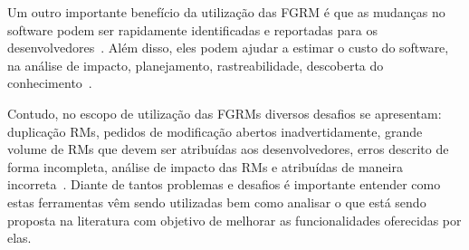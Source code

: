 Um outro importante benefício da utilização das FGRM é que as mudanças no
software podem ser rapidamente identificadas e reportadas para os
desenvolvedores~\cite{anvik2005coping}. Além disso, eles podem ajudar a estimar
o custo do software, na análise de impacto, planejamento, rastreabilidade,
descoberta do conhecimento~\cite{cavalcanti2013bug}.

Contudo, no escopo de utilização das FGRMs diversos desafios se apresentam:
duplicação RMs, pedidos de modificação abertos inadvertidamente, grande
volume de RMs que devem ser atribuídas aos desenvolvedores, erros descrito
de forma incompleta, análise de impacto das RMs e     atribuídas de maneira
incorreta~\cite{cavalcanti2014challenges}.  Diante de tantos problemas e
desafios é importante entender como estas ferramentas vêm sendo
utilizadas bem como analisar o que está sendo proposta na literatura com objetivo
de melhorar as funcionalidades oferecidas por elas\@.

%
%
%
%

